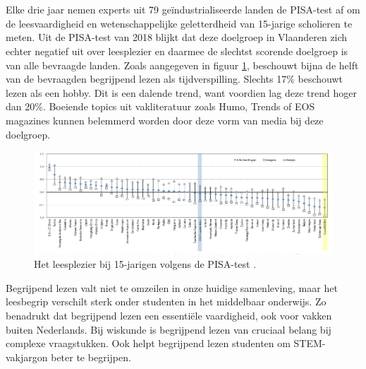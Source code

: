 \section{}%
\label{sec:probleemstelling}

Elke drie jaar nemen experts uit 79 geïndustrialiseerde landen de PISA-test af om de leesvaardigheid en wetenschappelijke geletterdheid van 15-jarige scholieren te meten. Uit de PISA-test van 2018 blijkt dat deze doelgroep in Vlaanderen zich echter negatief uit over leesplezier en daarmee de slechtst scorende doelgroep is van alle bevraagde landen. Zoals aangegeven in figuur \ref{img:oeso-leesplezier}, beschouwt bijna de helft van de bevraagden begrijpend lezen als tijdverspilling. Slechts 17\% beschouwt lezen als een hobby. Dit is een dalende trend, want voordien lag deze trend hoger dan 20\%. Boeiende topics uit vakliteratuur zoals Humo, Trends of EOS magazines kunnen belemmerd worden door deze vorm van media bij deze doelgroep.

\begin{figure}[H]
	\begin{center}
		\includegraphics[width=\linewidth]{img/oeso-graphic-leesplezier.png}
	\end{center}
	\caption{Het leesplezier bij 15-jarigen volgens de PISA-test \autocite{DeMeyer2019}.}
	\label{img:oeso-leesplezier}
\end{figure}

\medspace

Begrijpend lezen valt niet te omzeilen in onze huidige samenleving, maar het leesbegrip verschilt sterk onder studenten in het middelbaar onderwijs. Zo benadrukt \textcite{Vlaanderen2020} dat begrijpend lezen een essentiële vaardigheid, ook voor vakken buiten Nederlands. Bij wiskunde is begrijpend lezen van cruciaal belang bij complexe vraagstukken. Ook helpt begrijpend lezen studenten om STEM-vakjargon beter te begrijpen.

\medspace 

